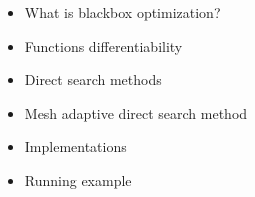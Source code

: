 \documentclass[8pt]{beamer}
\begin{document}
\begin{frame}{}
  \begin{itemize}
  \item { What is blackbox optimization?}
  \vspace{0.5cm}
  \item { Functions differentiability}
  \vspace{0.5cm}
  \item { Direct search methods}
  \vspace{0.5cm}
  \item { Mesh adaptive direct search method}
  \vspace{0.5cm}
  \item { Implementations}
  \vspace{0.5cm}
  \item {Running example}
  \end{itemize}
\end{frame}
\end{document}
